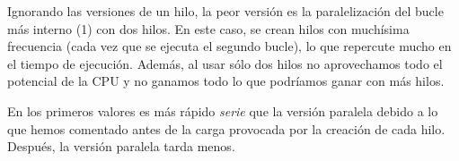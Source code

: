 \documentclass{apuntes}
\begin{document}
Ignorando las versiones de un hilo, la peor versión es la paralelización del bucle más interno (1) con dos hilos. En este caso, se crean hilos con muchísima frecuencia (cada vez que se ejecuta el segundo bucle), lo que repercute mucho en el tiempo de ejecución. Además, al usar sólo dos hilos no aprovechamos todo el potencial de la CPU y no ganamos todo lo que podríamos ganar con más hilos.



En los primeros valores es más rápido \textit{serie} que la versión paralela debido a lo que hemos comentado antes de la carga provocada por la creación de cada hilo. Después, la versión paralela tarda menos.
\end{document}
